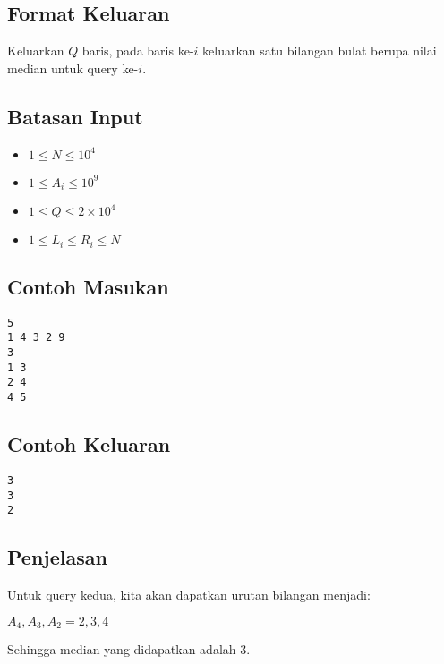 \documentclass{article}
\begin{document}
\subsection*{Format Keluaran}
Keluarkan $Q$ baris, pada baris ke-$i$ keluarkan satu bilangan bulat berupa nilai median untuk query ke-$i$.

\subsection*{Batasan Input}

\begin{itemize}
    \item{$1 \leq N \leq 10^4$}
    \item{$1 \leq A_i \leq 10^9$}
    \item{$1 \leq Q \leq 2 \times 10^4$}
    \item{$1 \leq L_i \leq R_i \leq N$}
\end{itemize}

\begin{multicols}{2}
\subsection*{Contoh Masukan}
\begin{lstlisting}
5
1 4 3 2 9
3
1 3
2 4
4 5
\end{lstlisting}
\columnbreak
\subsection*{Contoh Keluaran}
\begin{lstlisting}
3
3
2
\end{lstlisting}
\vfill
\null
\end{multicols}

\subsection*{Penjelasan}

Untuk query kedua, kita akan dapatkan urutan bilangan menjadi:

$A_4, A_3, A_2 = 2, 3, 4$

Sehingga median yang didapatkan adalah 3.
\end{document}
